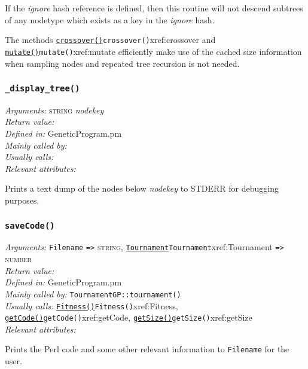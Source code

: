 \documentclass[a4paper]{article}
\begin{document}
If the \textit{ignore} hash reference is defined, then this routine
will not descend subtrees of any nodetype which exists as a key in the
\textit{ignore} hash.

The methods \hyperref[no]{\texttt{crossover()}}{\texttt{crossover()}}{xref:crossover} and \hyperref[no]{\texttt{mutate()}}{\texttt{mutate()}}{xref:mutate} efficiently
make use of the cached size information when sampling nodes and
repeated tree recursion is not needed.

\subsubsection{\texttt{\_display\_tree()}}\label{xref:_display_tree}
\begin{flushleft}
\textit{Arguments:} \textsc{string} \textit{nodekey}\\
\textit{Return value:} \\
\textit{Defined in:} GeneticProgram.pm\\
\textit{Mainly called by:} \\
\textit{Usually calls:} \\
\textit{Relevant attributes:}
\end{flushleft}

Prints a text dump of the nodes below \textit{nodekey} to STDERR for
debugging purposes.

\subsubsection{\texttt{saveCode()}}\label{xref:saveCode}
\begin{flushleft}
\textit{Arguments:} \texttt{Filename} \verb:=>: \textsc{string}, \hyperref[no]{\texttt{Tournament}}{\texttt{Tournament}}{xref:Tournament} \verb:=>: \textsc{number}\\
\textit{Return value:} \\
\textit{Defined in:} GeneticProgram.pm\\
\textit{Mainly called by:} \texttt{TournamentGP::tournament()}\\
\textit{Usually calls:} \hyperref[no]{\texttt{Fitness()}}{\texttt{Fitness()}}{xref:Fitness}, \hyperref[no]{\texttt{getCode()}}{\texttt{getCode()}}{xref:getCode}, \hyperref[no]{\texttt{getSize()}}{\texttt{getSize()}}{xref:getSize}\\
\textit{Relevant attributes:}
\end{flushleft}

Prints the Perl code and some other relevant information to
\texttt{Filename} for the user.
\end{document}
